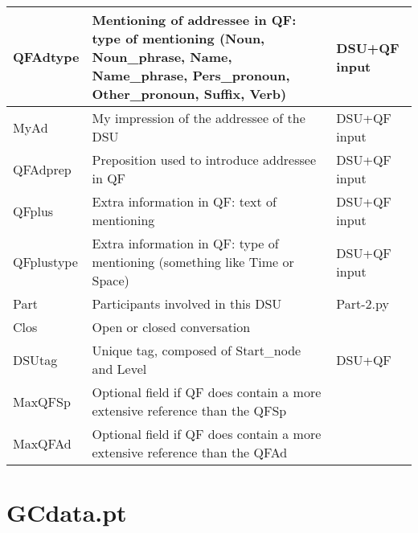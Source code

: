 \documentclass{article}
\begin{document}
\begin{longtable}{|l|p{}|l|}
QFAdtype    & Mentioning of addressee in QF: type of mentioning (Noun, Noun\_phrase, Name, Name\_phrase, Pers\_pronoun, Other\_pronoun, Suffix, Verb) & DSU+QF input \\ \hline
MyAd        & My impression of the addressee of the DSU & DSU+QF input \\ \hline
QFAdprep    & Preposition used to introduce addressee in QF & DSU+QF input \\ \hline
QFplus      & Extra information in QF: text of mentioning & DSU+QF input \\ \hline
QFplustype  & Extra information in QF: type of mentioning (something like Time or Space) & DSU+QF input \\ \hline
Part        & Participants involved in this DSU & Part-2.py \\ \hline
Clos        & Open or closed conversation & \\ \hline
DSUtag      & Unique tag, composed of Start\_node and Level & DSU+QF \\ \hline
MaxQFSp     & Optional field if QF does contain a more extensive reference than the QFSp \\ \hline
MaxQFAd     & Optional field if QF does contain a more extensive reference than the QFAd \\ \hline
\end{longtable}

\section{GCdata.pt}
\end{document}
